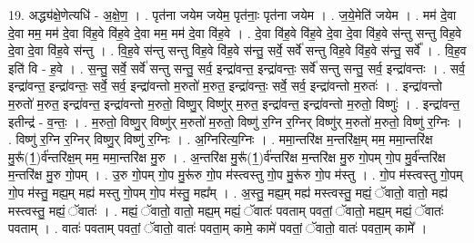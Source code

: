 \documentclass[17pt]{extarticle}
\begin{document}
19. अद्ध्य॑क्षे॒णेत्यधि॑ - अ॒क्षे॒ण॒ । . पृत॑ना जयेम जयेम॒ पृत॑नाः॒ पृत॑ना जयेम । . ज॒ये॒मेति॑ जयेम । . मम॑ दे॒वा दे॒वा मम॒ मम॑ दे॒वा वि॑ह॒वे वि॑ह॒वे दे॒वा मम॒ मम॑ दे॒वा वि॑ह॒वे । . दे॒वा वि॑ह॒वे वि॑ह॒वे दे॒वा दे॒वा वि॑ह॒वे स॑न्तु सन्तु विह॒वे दे॒वा दे॒वा वि॑ह॒वे स॑न्तु । . वि॒ह॒वे स॑न्तु सन्तु विह॒वे वि॑ह॒वे स॑न्तु॒ सर्वे॒ सर्वे॑ सन्तु विह॒वे वि॑ह॒वे स॑न्तु॒ सर्वे᳚ । . वि॒ह॒व इति॑ वि - ह॒वे । . स॒न्तु॒ सर्वे॒ सर्वे॑ सन्तु सन्तु॒ सर्व॒ इन्द्रा॑वन्त॒ इन्द्रा॑वन्तः॒ सर्वे॑ सन्तु सन्तु॒ सर्व॒ इन्द्रा॑वन्तः । . सर्व॒ इन्द्रा॑वन्त॒ इन्द्रा॑वन्तः॒ सर्वे॒ सर्व॒ इन्द्रा॑वन्तो म॒रुतो॑ म॒रुत॒ इन्द्रा॑वन्तः॒ सर्वे॒ सर्व॒ इन्द्रा॑वन्तो म॒रुतः॑ । . इन्द्रा॑वन्तो म॒रुतो॑ म॒रुत॒ इन्द्रा॑वन्त॒ इन्द्रा॑वन्तो म॒रुतो॒ विष्णु॒र् विष्णु॑र् म॒रुत॒ इन्द्रा॑वन्त॒ इन्द्रा॑वन्तो म॒रुतो॒ विष्णुः॑ । . इन्द्रा॑वन्त॒ इतीन्द्र॑ - व॒न्तः॒ । . म॒रुतो॒ विष्णु॒र् विष्णु॑र् म॒रुतो॑ म॒रुतो॒ विष्णु॑ र॒ग्नि र॒ग्निर् विष्णु॑र् म॒रुतो॑ म॒रुतो॒ विष्णु॑ र॒ग्निः । . विष्णु॑ र॒ग्नि र॒ग्निर् विष्णु॒र् विष्णु॑ र॒ग्निः । . अ॒ग्निरित्य॒ग्निः । . ममा॒न्तरि॑क्ष म॒न्तरि॑क्ष॒म् मम॒ ममा॒न्तरि॑क्ष मु॒रू᳚(1॒)र्व॑न्तरि॑क्ष॒म् मम॒ ममा॒न्तरि॑क्ष मु॒रु । . अ॒न्तरि॑क्ष मु॒रू᳚(1॒)र्व॑न्तरि॑क्ष म॒न्तरि॑क्ष मु॒रु गो॒पम् गो॒प मु॒र्व॑न्तरि॑क्ष म॒न्तरि॑क्ष मु॒रु गो॒पम् । . उ॒रु गो॒पम् गो॒प मु॒रू॑रु गो॒प म॑स्त्वस्तु गो॒प मु॒रू॑रु गो॒प म॑स्तु । . गो॒प म॑स्त्वस्तु गो॒पम् गो॒प म॑स्तु॒ मह्य॒म् मह्य॑ मस्तु गो॒पम् गो॒प म॑स्तु॒ मह्य᳚म् । . अ॒स्तु॒ मह्य॒म् मह्य॑ मस्त्वस्तु॒ मह्यं॒ ॅवातो॒ वातो॒ मह्य॑ मस्त्वस्तु॒ मह्यं॒ ॅवातः॑ । . मह्यं॒ ॅवातो॒ वातो॒ मह्य॒म् मह्यं॒ ॅवातः॑ पवताम् पवतां॒ ॅवातो॒ मह्य॒म् मह्यं॒ ॅवातः॑ पवताम् । . वातः॑ पवताम् पवतां॒ ॅवातो॒ वातः॑ पवता॒म् कामे॒ कामे॑ पवतां॒ ॅवातो॒ वातः॑ पवता॒म् कामे᳚ । \newline
\end{document}
